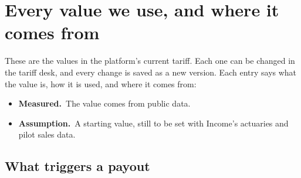 \documentclass[11pt,a4paper]{article}
\newcommand{\measured}{\textcolor{measured}{\textbf{Measured.}}}
\newcommand{\assumed}{\textcolor{assumed}{\textbf{Assumption.}}}
\begin{document}
\clearpage
\appendix
\renewcommand{\thesection}{\Alph{section}}
\section{Every value we use, and where it comes from}\label{app:params}

These are the values in the platform's current tariff. Each one can be changed in the tariff desk, and every change is saved as a new version. Each entry says what the value is, how it is used, and where it comes from:

\begin{itemize}[leftmargin=1.2em]
  \item \measured\ The value comes from public data.
  \item \assumed\ A starting value, still to be set with Income's actuaries and pilot sales data.
\end{itemize}

\subsection{What triggers a payout}
\end{document}
